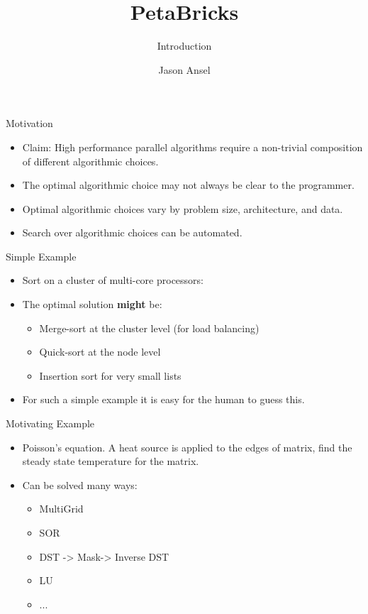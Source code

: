 \documentclass[pdf,blends]{prosper}
\title{PetaBricks}
\subtitle{Introduction}
\author{Jason Ansel}
\begin{document}
\begin{slide}{Motivation}
\begin{itemize}
\item Claim: High performance parallel algorithms require a non-trivial composition of different algorithmic choices.
\item The optimal algorithmic choice may not always be clear to the programmer.
\item Optimal algorithmic choices vary by problem size, architecture, and data.
\item Search over algorithmic choices can be automated.
\end{itemize}
\end{slide}

\begin{slide}{Simple Example}
\begin{itemize}
\item Sort on a cluster of multi-core processors:
\item The optimal solution {\bf might} be:
  \begin{itemize}
  \item Merge-sort at the cluster level (for load balancing)
  \item Quick-sort at the node level
  \item Insertion sort for very small lists
  \end{itemize}
\item For such a simple example it is easy for the human to guess this.
\end{itemize}
\end{slide}

\begin{slide}{Motivating Example}
\begin{itemize}
\item Poisson's equation.  A heat source is applied to the edges of matrix, find the steady state temperature for the matrix.
\item Can be solved many ways:
  \begin{itemize}
  \item MultiGrid
  \item SOR
  \item DST -> Mask-> Inverse DST
  \item LU
  \item ... 
  \end{itemize}
\end{itemize}
\end{slide}
\end{document}
